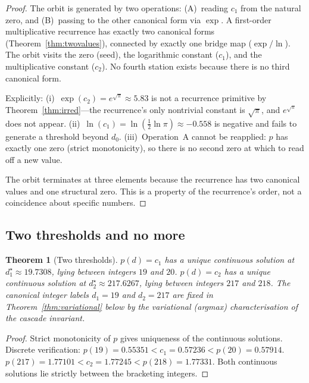 \documentclass[11pt,a4paper]{article}
\newtheorem{theorem}{Theorem}[section]
\begin{document}
\begin{proof}
The orbit is generated by two operations: (A)~reading $c_1$ from the
natural zero, and (B)~passing to the other canonical form via $\exp$.
A first-order multiplicative recurrence has exactly two canonical forms
(Theorem~\ref{thm:twovalues}), connected by exactly one bridge map
($\exp/\ln$). The orbit visits the zero (seed), the logarithmic constant
($c_1$), and the multiplicative constant ($c_2$). No fourth station
exists because there is no third canonical form.

Explicitly: (i)~$\exp(c_2) = e^{\sqrt{\pi}}\approx 5.83$ is not a
recurrence primitive by Theorem~\ref{thm:irred}---the recurrence's
only nontrivial constant is $\sqrt{\pi}$, and $e^{\sqrt{\pi}}$ does not
appear. (ii)~$\ln(c_1) = \ln(\frac{1}{2}\ln\pi) \approx -0.558$ is
negative and fails to generate a threshold beyond $d_0$.
(iii)~Operation~A cannot be reapplied: $p$ has exactly one zero (strict
monotonicity), so there is no second zero at which to read off a new
value.

The orbit terminates at three elements because the recurrence has two
canonical values and one structural zero. This is a property of the
recurrence's order, not a coincidence about specific numbers.
\end{proof}

\subsection{Two thresholds and no more}

\begin{theorem}[Two thresholds]\label{thm:thresholds}
$p(d) = c_1$ has a unique continuous solution at
$d_1^\star \approx 19.7308$, lying between integers $19$ and $20$.
$p(d) = c_2$ has a unique continuous solution at
$d_2^\star \approx 217.6267$, lying between integers $217$ and $218$.
The canonical integer labels $d_1 = 19$ and $d_2 = 217$ are fixed in
Theorem~\ref{thm:variational} below by the variational (argmax)
characterisation of the cascade invariant.
\end{theorem}

\begin{proof}
Strict monotonicity of $p$ gives uniqueness of the continuous solutions.
Discrete verification:
$p(19) = 0.55351 < c_1 = 0.57236 < p(20) = 0.57914$.
$p(217) = 1.77101 < c_2 = 1.77245 < p(218) = 1.77331$.
Both continuous solutions lie strictly between the bracketing integers.
\end{proof}
\end{document}
